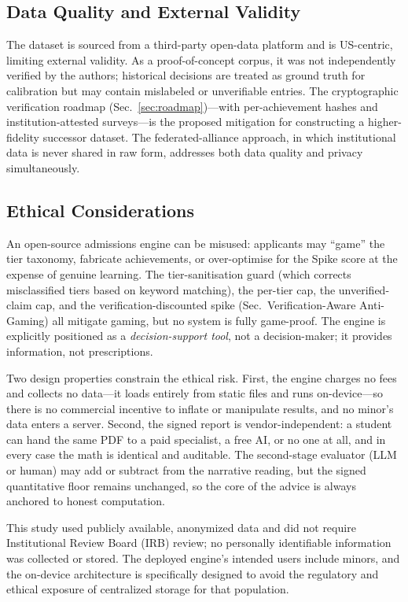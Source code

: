 \documentclass[conference]{IEEEtran}
\begin{document}
\subsection{Data Quality and External Validity}
The dataset is sourced from a third-party open-data platform and is US-centric, limiting external validity. As a proof-of-concept corpus, it was not independently verified by the authors; historical decisions are treated as ground truth for calibration but may contain mislabeled or unverifiable entries. The cryptographic verification roadmap (Sec.~\ref{sec:roadmap})---with per-achievement hashes and institution-attested surveys---is the proposed mitigation for constructing a higher-fidelity successor dataset. The federated-alliance approach, in which institutional data is never shared in raw form, addresses both data quality and privacy simultaneously.

\subsection{Ethical Considerations}
An open-source admissions engine can be misused: applicants may ``game'' the tier taxonomy, fabricate achievements, or over-optimise for the Spike score at the expense of genuine learning. The tier-sanitisation guard (which corrects misclassified tiers based on keyword matching), the per-tier cap, the unverified-claim cap, and the verification-discounted spike (Sec.~Verification-Aware Anti-Gaming) all mitigate gaming, but no system is fully game-proof. The engine is explicitly positioned as a \textit{decision-support tool}, not a decision-maker; it provides information, not prescriptions.

Two design properties constrain the ethical risk. First, the engine charges no fees and collects no data---it loads entirely from static files and runs on-device---so there is no commercial incentive to inflate or manipulate results, and no minor's data enters a server. Second, the signed report is vendor-independent: a student can hand the same PDF to a paid specialist, a free AI, or no one at all, and in every case the math is identical and auditable. The second-stage evaluator (LLM or human) may add or subtract from the narrative reading, but the signed quantitative floor remains unchanged, so the core of the advice is always anchored to honest computation.

This study used publicly available, anonymized data and did not require Institutional Review Board (IRB) review; no personally identifiable information was collected or stored. The deployed engine's intended users include minors, and the on-device architecture is specifically designed to avoid the regulatory and ethical exposure of centralized storage for that population.
\end{document}
